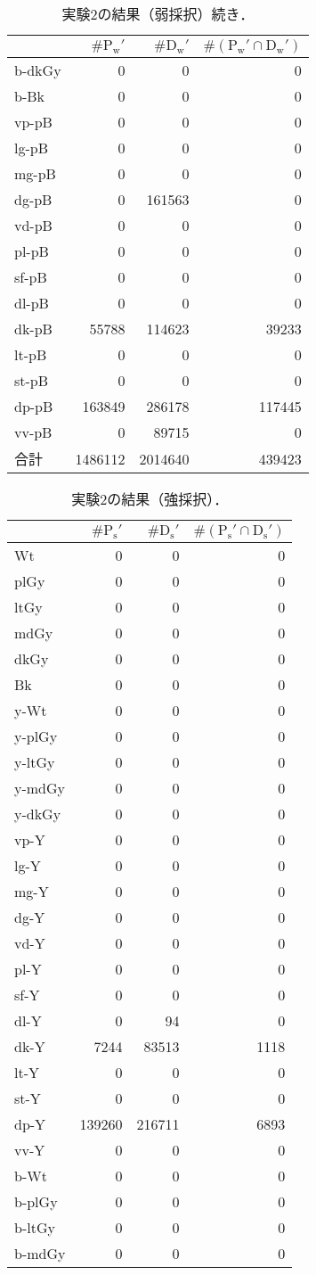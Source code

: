 \documentclass[uplatex,paper=a4,fontsize=4.0truemm,jafontsize=4.0truemm,head_space=30.0truemm,foot_space=30.0truemm,baselineskip=8.0truemm,line_length=40zw,gutter=25.0truemm,oneside,openany,fleqn,hanging_panctuation,open_bracket_pos=nibu_tentsuki,dvipdfmx,jis2004,book,titlepage]{jlreq}
\theoremstyle{mystyle}
\newcommand{\zwspace}{\hspace{1zw}\relax}
\newcommand{\captiondot}[1]{\caption{#1．}}
\newcommand{\tableinput}[4]{\begin{table}[tbp]\centering\captiondot{#3}\label{tab:#4}\begin{tabular}{#1}#2\end{tabular}\end{table}}
\newcommand{\parentheses}[1]{\left(#1\right)}
\begin{document}
				\tableinput{l|rrr}{ & \(\#\textrm{P}_\textrm{w}'\) & \(\#\textrm{D}_\textrm{w}'\) & \(\#\parentheses{\textrm{P}_\textrm{w}'\cap\textrm{D}_\textrm{w}'}\) \\ \hline
					b-dkGy & 0 & 0 & 0 \\
					b-Bk & 0 & 0 & 0 \\
					vp-pB & 0 & 0 & 0 \\
					lg-pB & 0 & 0 & 0 \\
					mg-pB & 0 & 0 & 0 \\
					dg-pB & 0 & 161563 & 0 \\
					vd-pB & 0 & 0 & 0 \\
					pl-pB & 0 & 0 & 0 \\
					sf-pB & 0 & 0 & 0 \\
					dl-pB & 0 & 0 & 0 \\
					dk-pB & 55788 & 114623 & 39233 \\
					lt-pB & 0 & 0 & 0 \\
					st-pB & 0 & 0 & 0 \\
					dp-pB & 163849 & 286178 & 117445 \\
					vv-pB & 0 & 89715 & 0 \\ \hline
					合計 & 1486112 & 2014640 & 439423}{実験2の結果（弱採択）\zwspace 続き}{result25}
				\clearpage
				\tableinput{l|rrr}{ & \(\#\textrm{P}_\textrm{s}'\) & \(\#\textrm{D}_\textrm{s}'\) & \(\#\parentheses{\textrm{P}_\textrm{s}'\cap\textrm{D}_\textrm{s}'}\) \\ \hline
					Wt & 0 & 0 & 0 \\
					plGy & 0 & 0 & 0 \\
					ltGy & 0 & 0 & 0 \\
					mdGy & 0 & 0 & 0 \\
					dkGy & 0 & 0 & 0 \\
					Bk & 0 & 0 & 0 \\
					y-Wt & 0 & 0 & 0 \\
					y-plGy & 0 & 0 & 0 \\
					y-ltGy & 0 & 0 & 0 \\
					y-mdGy & 0 & 0 & 0 \\
					y-dkGy & 0 & 0 & 0 \\
					vp-Y & 0 & 0 & 0 \\
					lg-Y & 0 & 0 & 0 \\
					mg-Y & 0 & 0 & 0 \\
					dg-Y & 0 & 0 & 0 \\
					vd-Y & 0 & 0 & 0 \\
					pl-Y & 0 & 0 & 0 \\
					sf-Y & 0 & 0 & 0 \\
					dl-Y & 0 & 94 & 0 \\
					dk-Y & 7244 & 83513 & 1118 \\
					lt-Y & 0 & 0 & 0 \\
					st-Y & 0 & 0 & 0 \\
					dp-Y & 139260 & 216711 & 6893 \\
					vv-Y & 0 & 0 & 0 \\
					b-Wt & 0 & 0 & 0 \\
					b-plGy & 0 & 0 & 0 \\
					b-ltGy & 0 & 0 & 0 \\
					b-mdGy & 0 & 0 & 0}{実験2の結果（強採択）}{result23}
\end{document}
